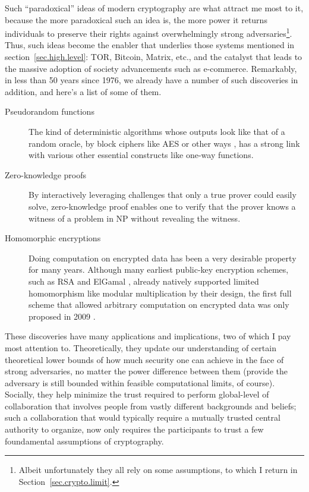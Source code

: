 \documentclass[10pt]{article}
\begin{document}
Such ``paradoxical'' ideas of modern cryptography are what attract me most to
it, because the more paradoxical such an idea is, the more power it returns
individuals to preserve their rights against overwhelmingly strong
adversaries\footnote{Albeit unfortunately they all rely on some assumptions,
to which I return in Section~\ref{sec.crypto.limit}.}.  Thus, such ideas become the
enabler that underlies those systems mentioned in section~\ref{sec.high.level}:
TOR, Bitcoin, Matrix, etc., and the catalyst that leads to the massive adoption
of society advancements such as e-commerce. Remarkably, in less than 50 years
since 1976, we already have a number of such discoveries in addition, and
here's a list of some of them.
\begin{description}
\item[Pseudorandom functions] The kind of deterministic algorithms
	whose outputs look like that of a random oracle, by block ciphers like
	AES\cite{aes} or other ways \cite{pseudo.rand.cons.2}, has a strong link
	with various other essential constructs like one-way functions.

\item[Zero-knowledge proofs] By interactively leveraging challenges that only a
	true prover could easily solve, zero-knowledge proof \cite{zero.knowledge}
	enables one to verify that the prover knows a witness of a problem in NP
	\cite{zero.knowledge.np} without revealing the witness.

\item[Homomorphic encryptions] Doing computation on encrypted data has been a
	very desirable property for many years. Although many earliest public-key
	encryption schemes, such as RSA \cite{rsa} and ElGamal \cite{elgamal},
	already natively supported limited homomorphism like modular
	multiplication by their design, the first full scheme that allowed
	arbitrary computation on encrypted data was only proposed in 2009
	\cite{first.full.homo}.
\end{description}

These discoveries have many applications and implications, two of which I pay
most attention to. Theoretically, they update our understanding of certain
theoretical lower bounds of how much security one can achieve in the face of
strong adversaries, no matter the power difference between them (provide the
adversary is still bounded within feasible computational limits, of course).
Socially, they help minimize the trust required to perform global-level
of collaboration that involves people from vastly different backgrounds and
beliefs; such a collaboration that would typically require a mutually trusted
central authority to organize, now only requires the participants to trust a
few foundamental assumptions of cryptography.
\end{document}
